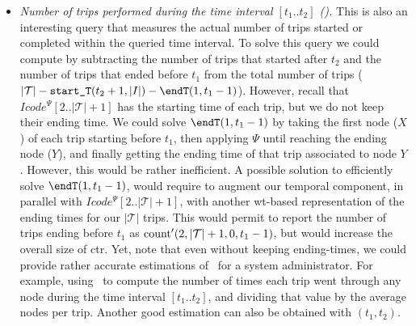 \begin{itemize}
	\item {\em Number of trips performed during the time interval $[t_1..t_2]$ (\tripT).} This is also an interesting query that measures the actual number of trips started or completed within the queried time interval. 
	To solve this query
	we could compute {\em \tripT} by subtracting the number of trips that started after $t_2$  and the number of trips that ended 	before $t_1$ from the total number of trips ($|\mathcal{T}| - \startT(t_2+1,|I|) - \endT(1,t_1-1)$). 
	However, recall that
	$Icode^{\Psi}[2..|\mathcal{T}|+1]$ has the starting time of each trip, but we do not keep their ending time.
	We could solve $\endT(1,t_1-1)$ by taking the first node ($X$) of each trip starting
	before $t_1$, then applying $\Psi$ until reaching the ending node ($Y$), and finally getting the ending
	time of that trip associated to node $Y$. However, this would be rather inefficient.
	A possible solution to efficiently solve $\endT(1,t_1-1)$, would require to augment our temporal
	component, in parallel with $Icode^{\Psi}[2..|\mathcal{T}|+1]$, with another \gls{wt}-based representation of the 
	ending times for our $|\mathcal{T}|$ trips. This would permit to report the number of trips
	ending before $t_1$ as $\operatorname{count}'(2,|\mathcal{T}|+1,0,t_1-1)$, but would increase the overall size of \gls{ctr}.
	Yet, note that even without keeping ending-times, we could 
	provide rather accurate estimations of \tripT\ for a system administrator. For example, using \loadT\
	to compute the number of times each trip went through any node during the time interval $[t_1..t_2]$, 
	and dividing that value by the average nodes per trip. Another good estimation can also be obtained with \startT$(t_1,t_2)$.


	\end{itemize}

